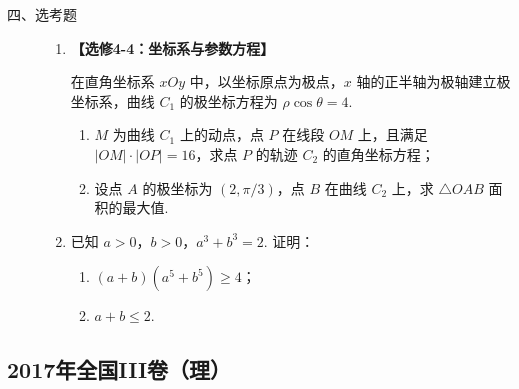 \begin{description}

    \item[四、选考题]

    \begin{enumerate}[leftmargin=5pt]

      \addtocounter{enumi}{+21}

        \item \textbf{【选修4-4：坐标系与参数方程】}

在直角坐标系 \(xOy\) 中，以坐标原点为极点，\(x\) 轴的正半轴为极轴建立极坐标系，曲线 \(C_1\) 的极坐标方程为 \(\rho\cos\theta=4\).
\begin{enumerate}
\item \(M\) 为曲线 \(C_1\) 上的动点，点 \(P\) 在线段 \(OM\) 上，且满足 \(\lvert OM\rvert\cdot\lvert OP\rvert=16\)，求点 \(P\) 的轨迹 \(C_2\) 的直角坐标方程；
\item 设点 \(A\) 的极坐标为 \((2,\pi/3)\)，点 \(B\) 在曲线 \(C_2\) 上，求 \(\triangle OAB\) 面积的最大值.
\end{enumerate}

        \item 已知 \(a>0\)，\(b>0\)，\(a^3+b^3=2\). 证明：
\begin{enumerate}
\item \((a+b)(a^5+b^5)\ge4\)；
\item \(a+b\le2\).
\end{enumerate}

    \end{enumerate}

\end{description}


\subsection{2017年全国III卷（理）}\label{gk:2017年全国III卷（理）}

